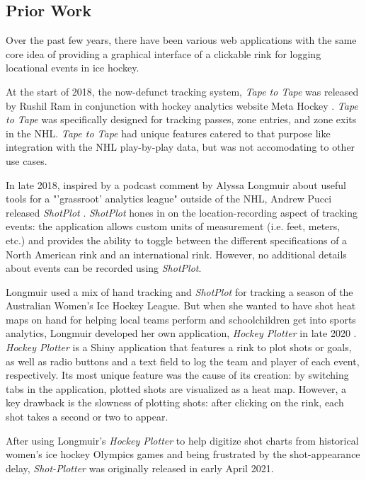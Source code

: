 \documentclass[letterpaper]{article}
\begin{document}
\subsection{Prior Work}
Over the past few years, there have been various web applications with the same core idea of providing a graphical interface of a clickable rink for logging locational events in ice hockey.

At the start of 2018, the now-defunct tracking system, \textit{Tape to Tape} was released by Rushil Ram in conjunction with hockey analytics website Meta Hockey \cite{tapetotape}. \textit{Tape to Tape} was specifically designed for tracking passes, zone entries, and zone exits in the NHL. \textit{Tape to Tape} had unique features catered to that purpose like integration with the NHL play-by-play data, but was not accomodating to other use cases.

In late 2018, inspired by a podcast comment by Alyssa Longmuir about useful tools for a "'grassroot' analytics league" outside of the NHL, Andrew Pucci released \textit{ShotPlot} \cite{alyssaAustraliaArticle}. \textit{ShotPlot} \cite{shotplot} hones in on the location-recording aspect of tracking events: the application allows custom units of measurement (i.e. feet, meters, etc.) and provides the ability to toggle between the different specifications of a North American rink and an international rink. However, no additional details about events can be recorded using \textit{ShotPlot}.

Longmuir used a mix of hand tracking and \textit{ShotPlot} for tracking a season of the Australian Women's Ice Hockey League. But when she wanted to have shot heat maps on hand for helping local teams perform and schoolchildren get into sports analytics, Longmuir developed her own application, \textit{Hockey Plotter} in late 2020 \cite{alyssaShinyArticle}. \textit{Hockey Plotter} \cite{alyssaWebsite} is a Shiny application that features a rink to plot shots or goals, as well as radio buttons and a text field to log the team and player of each event, respectively. Its most unique feature was the cause of its creation: by switching tabs in the application, plotted shots are visualized as a heat map. However, a key drawback is the slowness of plotting shots: after clicking on the rink, each shot takes a second or two to appear.

After using Longmuir's \textit{Hockey Plotter} to help digitize shot charts from historical women's ice hockey Olympics games and being frustrated by the shot-appearance delay,  \textit{Shot-Plotter} was originally released in early April 2021.
\end{document}
